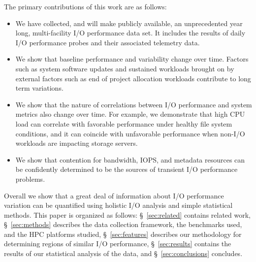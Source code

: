 

The primary contributions of this work are as follows: 
\begin{itemize}[leftmargin=*]
\item We have collected, and will make publicly available, an unprecedented year long, multi-facility
I/O performance data set. It includes the results of daily I/O performance
probes and their associated telemetry data.
\item We show that baseline performance and variability change over time.
Factors such as system software updates and sustained workloads brought on
by external factors such as end of project allocation workloads contribute to long term variations. 
% 
% 
\item We show that the nature of correlations between I/O performance and system metrics also change over
time. For example, we demonstrate that high CPU load can correlate with favorable performance under healthy file system conditions, and it can coincide with unfavorable performance when non-I/O workloads are impacting storage servers.
\item We show that contention for bandwidth, IOPS, and metadata resources can be confidently determined to be the sources of transient I/O performance problems.
\end{itemize}
Overall we show that a great deal of information about I/O performance variation can be quantified using holistic I/O analysis and simple statistical methods.
This paper is organized as follows: \S~\ref{sec:related} contains related work, \S~\ref{sec:methods} describes the data collection framework, the benchmarks used, and the HPC platforms studied, \S~\ref{sec:features} describes our methodology for determining regions of similar I/O performance, \S~\ref{sec:results} contains the results of our statistical analysis of the data, and \S~\ref{sec:conclusions} concludes. 

